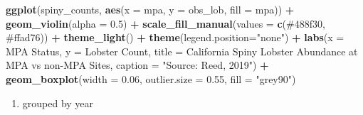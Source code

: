 \documentclass[
]{article}
\newenvironment{Shaded}{\begin{snugshade}}{\end{snugshade}}
\newcommand{\AttributeTok}[1]{\textcolor[rgb]{0.13,0.29,0.53}{#1}}
\newcommand{\FloatTok}[1]{\textcolor[rgb]{0.00,0.00,0.81}{#1}}
\newcommand{\FunctionTok}[1]{\textcolor[rgb]{0.13,0.29,0.53}{\textbf{#1}}}
\newcommand{\NormalTok}[1]{#1}
\newcommand{\SpecialCharTok}[1]{\textcolor[rgb]{0.81,0.36,0.00}{\textbf{#1}}}
\newcommand{\StringTok}[1]{\textcolor[rgb]{0.31,0.60,0.02}{#1}}
\providecommand{\tightlist}{%
  \setlength{\itemsep}{0pt}\setlength{\parskip}{0pt}}
\begin{document}
\begin{Shaded}
\begin{Highlighting}[]
\FunctionTok{ggplot}\NormalTok{(spiny\_counts, }\FunctionTok{aes}\NormalTok{(}\AttributeTok{x =}\NormalTok{ mpa, }\AttributeTok{y =}\NormalTok{ obs\_lob, }\AttributeTok{fill =}\NormalTok{ mpa)) }\SpecialCharTok{+} 
    \FunctionTok{geom\_violin}\NormalTok{(}\AttributeTok{alpha =} \FloatTok{0.5}\NormalTok{) }\SpecialCharTok{+} 
    \FunctionTok{scale\_fill\_manual}\NormalTok{(}\AttributeTok{values =} \FunctionTok{c}\NormalTok{(}\StringTok{\textquotesingle{}\#488f30\textquotesingle{}}\NormalTok{, }\StringTok{\textquotesingle{}\#ffad76\textquotesingle{}}\NormalTok{)) }\SpecialCharTok{+} 
    \FunctionTok{theme\_light}\NormalTok{() }\SpecialCharTok{+} 
    \FunctionTok{theme}\NormalTok{(}\AttributeTok{legend.position=}\StringTok{"none"}\NormalTok{) }\SpecialCharTok{+} 
    \FunctionTok{labs}\NormalTok{(}\AttributeTok{x =} \StringTok{\textquotesingle{}MPA Status\textquotesingle{}}\NormalTok{, }
         \AttributeTok{y =} \StringTok{\textquotesingle{}Lobster Count\textquotesingle{}}\NormalTok{, }
         \AttributeTok{title =} \StringTok{\textquotesingle{}California Spiny Lobster Abundance at MPA vs non{-}MPA Sites\textquotesingle{}}\NormalTok{, }
         \AttributeTok{caption =} \StringTok{"Source: Reed, 2019"}\NormalTok{) }\SpecialCharTok{+} 
    \FunctionTok{geom\_boxplot}\NormalTok{(}\AttributeTok{width =} \FloatTok{0.06}\NormalTok{, }
                 \AttributeTok{outlier.size =} \FloatTok{0.55}\NormalTok{, }
                 \AttributeTok{fill =} \StringTok{"grey90"}\NormalTok{)}
\end{Highlighting}
\end{Shaded}

\begin{enumerate}
\def\labelenumi{\arabic{enumi})}
\setcounter{enumi}{2}
\tightlist
\item
  grouped by year
\end{enumerate}
\end{document}
